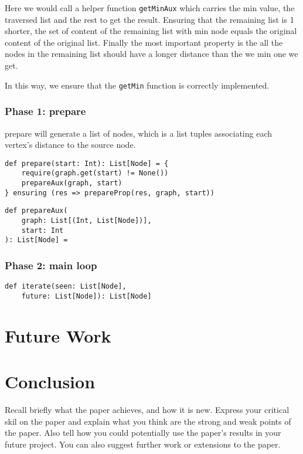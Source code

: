 \documentclass[11pt,a4paper]{article}
\begin{document}
Here we would call a helper function \texttt{getMinAux} which carries the min value,
the traversed list and the rest to get the result. Ensuring that the remaining list
is 1 shorter, the set of content of the remaining list with min node equals the original
content of the original list. Finally the most important property is the all the nodes
in the remaining list should have a longer distance than the we min one we get.

In this way, we ensure that the \texttt{getMin} function is correctly implemented.

\subsubsection{Phase 1: prepare}

prepare will generate a list of nodes, which is a list tuples associating each vertex's
distance to the source node.

\begin{lstlisting}
def prepare(start: Int): List[Node] = {
    require(graph.get(start) != None())
    prepareAux(graph, start)
} ensuring (res => prepareProp(res, graph, start))
\end{lstlisting}

\begin{lstlisting}
def prepareAux(
    graph: List[(Int, List[Node])],
    start: Int
): List[Node] =
\end{lstlisting}

\subsubsection{Phase 2: main loop}

\begin{lstlisting}
def iterate(seen: List[Node], 
    future: List[Node]): List[Node]
\end{lstlisting}

\section{Future Work}

\section{Conclusion}
Recall  briefly what the paper achieves, and how it is new. Express your critical skil on the paper and explain what you think are the strong and weak points of the paper. Also tell how you could potentially use the paper's results in your future project. You can also suggest further work or extensions to the paper.




\end{document}
